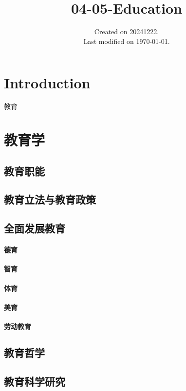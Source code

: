 \documentclass[UTF8]{../../ApplicationUniverse}
\begin{document}
\title{04-05-Education}
\date{Created on 20241222.\\   Last modified on \today.}
\maketitle
\tableofcontents


\chapter{Introduction}


教育








\chapter{教育学}
\section{教育职能}
\section{教育立法与教育政策}
\section{全面发展教育}
    \subsubsection{德育}
    \subsubsection{智育}
    \subsubsection{体育}
    \subsubsection{美育}
    \subsubsection{劳动教育}
\section{教育哲学}
\section{教育科学研究}
\end{document}
